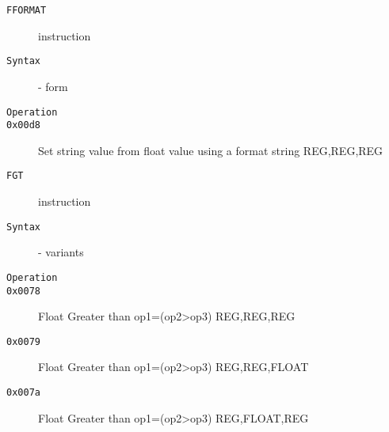 \clearpage
\begin{description}
\item[\texttt{FFORMAT}] instruction\\
\item[\texttt{Syntax}] - form \\

\item[\texttt{Operation}]
\item[\texttt{}]
\item[\texttt{0x00d8}] Set string value from float value using a format string  {REG,REG,REG}       \\
\end{description}
\clearpage
\begin{description}
\item[\texttt{FGT}] instruction\\
\item[\texttt{Syntax}] - variants\\

\item[\texttt{Operation}]
\item[\texttt{}]
\item[\texttt{0x0078}] Float Greater than op1=(op2>op3)  {REG,REG,REG}       \\
\item[\texttt{0x0079}] Float Greater than op1=(op2>op3)  {REG,REG,FLOAT}     \\
\item[\texttt{0x007a}] Float Greater than op1=(op2>op3)  {REG,FLOAT,REG}     \\
\end{description}
\clearpage

